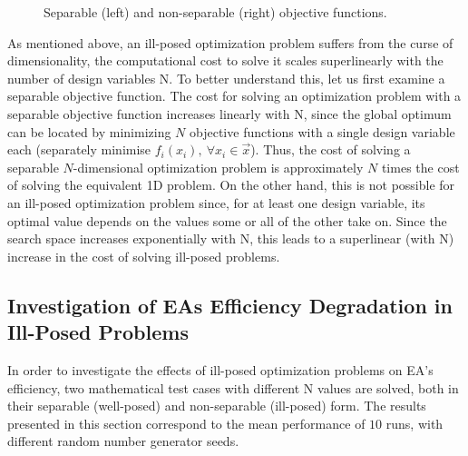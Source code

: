 \begin{figure}[h!]
\begin{minipage}[b]{1\linewidth}
 \centering
\end{minipage}
\caption{Separable (left) and non-separable (right) objective functions.} 
\label{nonsep}
\end{figure}

As mentioned above, an ill-posed optimization problem suffers from the curse of dimensionality, the computational cost to solve it scales superlinearly with the number of design variables N. To better understand this, let us first examine a separable objective function. The cost for solving an optimization problem with a separable objective function increases linearly with N, since the global optimum can be located by minimizing $N$ objective functions with a single design variable each (separately minimise $f_i(x_i),~ \forall x_i \in \vec{x}$). Thus, the cost of solving a separable $N$-dimensional optimization problem is approximately $N$ times the cost of solving the equivalent 1D problem. On the other hand, this is not possible for an ill-posed optimization problem since, for at least one design variable, its optimal value depends on the values some or all of the other take on. Since the search space increases exponentially with N, this leads to a superlinear (with N) increase in the cost of solving ill-posed problems.   
 
\subsection{Investigation of EAs Efficiency Degradation in Ill-Posed Problems}
\label{Inv2}

In order to investigate the effects of ill-posed optimization problems on EA's efficiency, two mathematical test cases with different N values are solved, both in their separable (well-posed) and non-separable (ill-posed) form. The results presented in this section correspond to the mean performance of $10$ runs, with different random number generator seeds. 

